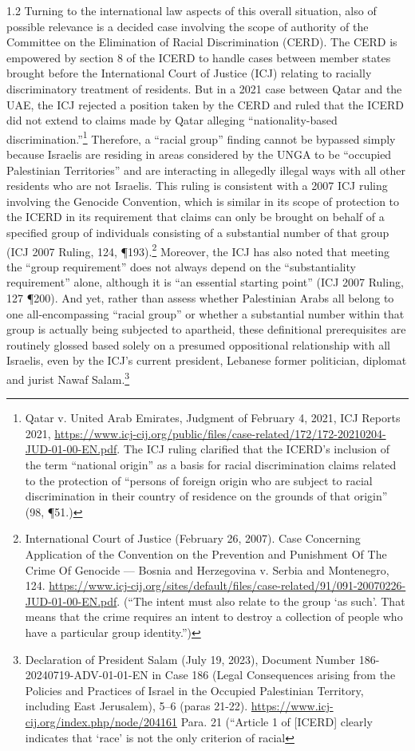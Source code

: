 \documentclass[../unravbook.tex]{subfiles}
\begin{document}
\begin{spacing}{1.2}
Turning to the international law aspects of this overall situation, also of possible relevance is a decided case involving the scope of authority of the Committee on the Elimination of Racial Discrimination (CERD). The CERD is empowered by section 8 of the ICERD to handle cases between member states brought before the International Court of Justice (ICJ) relating to racially discriminatory treatment of residents. But in a 2021 case between Qatar and the UAE, the ICJ rejected a position taken by the CERD and ruled that the ICERD did not extend to claims made by Qatar alleging \enquote{nationality-based discrimination.}\footnote{Qatar v. United Arab Emirates, Judgment of February 4, 2021, ICJ Reports 2021, 
\url{https://www.icj-cij.org/public/files/case-related/172/172-20210204-JUD-01-00-EN.pdf}. The ICJ ruling clarified that the ICERD's inclusion of the term \enquote{national origin} as a basis for racial discrimination claims related to the protection of \enquote{persons of foreign origin who are subject to racial discrimination in their country of residence on the grounds of that origin} (98, \P 51.)} Therefore, a \enquote{racial group} finding cannot be bypassed simply because Israelis are residing in areas considered by the UNGA to be \enquote{occupied Palestinian Territories} and are interacting in allegedly illegal ways with all other residents who are not Israelis. This ruling is consistent with a 2007 ICJ ruling involving the Genocide Convention, which is similar in its scope of protection to the ICERD in its requirement that claims can only be brought on behalf of a specified group of individuals consisting of a substantial number of that group (ICJ 2007 Ruling, 124, \P 193).\footnote{International Court of Justice (February 26, 2007). Case Concerning Application of the Convention on the Prevention and Punishment Of The Crime Of Genocide --- Bosnia and Herzegovina v. Serbia and Montenegro, 124. \url{https://www.icj-cij.org/sites/default/files/case-related/91/091-20070226-JUD-01-00-EN.pdf}. (\enquote{The intent must also relate to the group \enquote{as such}. That means that the crime requires an intent to destroy a collection of people who have a particular group identity.})} Moreover, the ICJ has also noted that meeting the \enquote{group requirement} does not always depend on the \enquote{substantiality requirement} alone, although it is \enquote{an essential starting point} (ICJ 2007 Ruling, 127 \P 200). And yet, rather than assess whether Palestinian Arabs all belong to one all-encompassing ``racial group'' or whether a substantial number within that group is actually being subjected to apartheid, these definitional prerequisites are routinely glossed based solely on a presumed oppositional relationship with all Israelis, even by the ICJ's current president, Lebanese former politician, diplomat and jurist Nawaf Salam.\footnote{Declaration of President Salam (July 19, 2023), Document Number 186-20240719-ADV-01-01-EN in Case 186 (Legal Consequences arising from the Policies and Practices of Israel in the Occupied Palestinian Territory, including East Jerusalem), 5--6 (paras 21-22). \url{https://www.icj-cij.org/index.php/node/204161} Para. 21 (``Article 1 of [ICERD] clearly indicates that \enquote*{race} is not the only criterion of racial }
\end{spacing}
\end{document}
